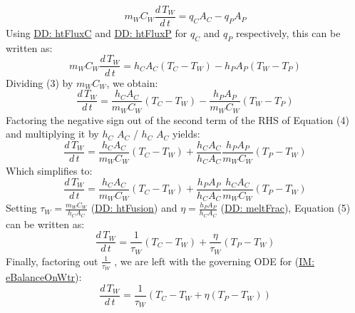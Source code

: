 \documentclass[12pt]{article}
\begin{document}
\begin{displaymath}
{m_{W}} {C_{W}} \frac{d\,{T_{W}}}{d\,t}={q_{C}} {A_{C}}-{q_{P}} {A_{P}}
\end{displaymath}
Using \hyperref[DD:htFluxC]{DD: htFluxC} and \hyperref[DD:htFluxP]{DD: htFluxP} for ${q_{C}}$ and ${q_{P}}$ respectively, this can be written as:
\begin{displaymath}
{m_{W}} {C_{W}} \frac{d\,{T_{W}}}{d\,t}={h_{C}} {A_{C}} \left({T_{C}}-{T_{W}}\right)-{h_{P}} {A_{P}} \left({T_{W}}-{T_{P}}\right)
\end{displaymath}
Dividing (3) by ${m_{W}}$${C_{W}}$, we obtain:
\begin{displaymath}
\frac{d\,{T_{W}}}{d\,t}=\frac{{h_{C}} {A_{C}}}{{m_{W}} {C_{W}}} \left({T_{C}}-{T_{W}}\right)-\frac{{h_{P}} {A_{P}}}{{m_{W}} {C_{W}}} \left({T_{W}}-{T_{P}}\right)
\end{displaymath}
Factoring the negative sign out of the second term of the RHS of Equation (4) and multiplying it by ${h_{C}}$ ${A_{C}}$ / ${h_{C}}$ ${A_{C}}$ yields:
\begin{displaymath}
\frac{d\,{T_{W}}}{d\,t}=\frac{{h_{C}} {A_{C}}}{{m_{W}} {C_{W}}} \left({T_{C}}-{T_{W}}\right)+\frac{{h_{C}} {A_{C}}}{{h_{C}} {A_{C}}} \frac{{h_{P}} {A_{P}}}{{m_{W}} {C_{W}}} \left({T_{P}}-{T_{W}}\right)
\end{displaymath}
Which simplifies to:
\begin{displaymath}
\frac{d\,{T_{W}}}{d\,t}=\frac{{h_{C}} {A_{C}}}{{m_{W}} {C_{W}}} \left({T_{C}}-{T_{W}}\right)+\frac{{h_{P}} {A_{P}}}{{h_{C}} {A_{C}}} \frac{{h_{C}} {A_{C}}}{{m_{W}} {C_{W}}} \left({T_{P}}-{T_{W}}\right)
\end{displaymath}
Setting ${τ_{W}}=\frac{{m_{W}} {C_{W}}}{{h_{C}} {A_{C}}}$ (\hyperref[DD:htFusion]{DD: htFusion}) and $η=\frac{{h_{P}} {A_{P}}}{{h_{C}} {A_{C}}}$ (\hyperref[DD:meltFrac]{DD: meltFrac}), Equation (5) can be written as:
\begin{displaymath}
\frac{d\,{T_{W}}}{d\,t}=\frac{1}{{τ_{W}}} \left({T_{C}}-{T_{W}}\right)+\frac{η}{{τ_{W}}} \left({T_{P}}-{T_{W}}\right)
\end{displaymath}
Finally, factoring out $\frac{1}{{τ_{W}}}$ , we are left with the governing ODE for (\hyperref[IM:eBalanceOnWtr]{IM: eBalanceOnWtr}):
\begin{displaymath}
\frac{d\,{T_{W}}}{d\,t}=\frac{1}{{τ_{W}}} \left({T_{C}}-{T_{W}}+η \left({T_{P}}-{T_{W}}\right)\right)
\end{displaymath}
\par~
\end{document}
